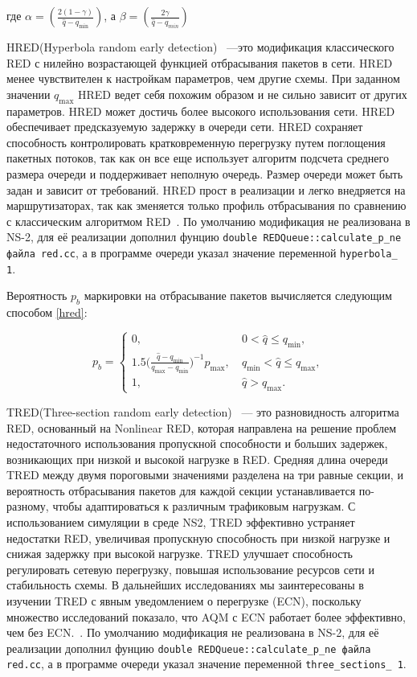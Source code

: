 где $\alpha = (\frac{2(1 - \gamma)}{\hat{q} - q_{\min}})$, а $\beta = (\frac{2\gamma}{\hat{q} - q_{min}})$


HRED(Hyperbola random early detection) ~---это модификация классического RED с нилейно возрастающей функцией отбрасывания пакетов в сети.
HRED менее чувствителен к настройкам параметров, чем другие схемы. При заданном значении $q_{\max}$ HRED ведет себя похожим образом и не сильно зависит от других параметров.
HRED может достичь более высокого использования сети. HRED обеспечивает предсказуемую задержку в очереди сети. HRED сохраняет способность контролировать кратковременную перегрузку путем поглощения пакетных потоков, так как он все еще использует алгоритм подсчета среднего размера очереди и поддерживает неполную очередь. Размер очереди может быть задан и зависит от требований. HRED прост в реализации и легко внедряется на маршрутизаторах, так как зменяется только профиль отбрасывания по сравнению с классическим алгоритмом RED~\cite{HRED}. По умолчанию модификация не реализована в NS-2, для её реализации дополнил фунцию \verb|double REDQueue::calculate_p_ne файла red.cc|, а в программе очереди указал значение переменной \verb|hyperbola_ 1|.
 
Вероятность $p_{b}$ маркировки на
отбрасывание пакетов вычисляется следующим способом \eqref{hred}:

\begin{equation}
\label{hred}
p_{b} = \begin{cases}
        0, &  \ 0 < \hat{q} \leqslant q_{\min},
        \\
        1.5({\frac{\hat{q} - q_{\min}}{q_{\max} - q_{\min}})^{-1}} {p_{\max}}, & \ q_{\min} < \hat{q} \leqslant q_{\max},
        \\
        1, &  \ \hat{q} > q_{\max}.
\end{cases}
\end{equation}


TRED(Three-section random early detection) ~--- это разновидность алгоритма RED, основанный на Nonlinear RED, которая направлена на решение проблем недостаточного использования пропускной способности и больших задержек, возникающих при низкой и высокой нагрузке в RED. 
Средняя длина очереди TRED между двумя пороговыми значениями разделена на три равные секции, и вероятность отбрасывания пакетов для каждой секции устанавливается по-разному, чтобы адаптироваться к различным трафиковым нагрузкам. С использованием симуляции в среде NS2, TRED эффективно устраняет недостатки RED, увеличивая пропускную способность при низкой нагрузке и снижая задержку при высокой нагрузке. TRED улучшает способность регулировать сетевую перегрузку, повышая использование ресурсов сети и стабильность схемы. В дальнейших исследованиях мы заинтересованы в изучении TRED с явным уведомлением о перегрузке (ECN), поскольку множество исследований показало, что AQM с ECN работает более эффективно, чем без ECN.~\cite{TRED}. По умолчанию модификация не реализована в NS-2, для её реализации дополнил фунцию \verb|double REDQueue::calculate_p_ne файла red.cc|, а в программе очереди указал значение переменной \verb|three_sections_ 1|. 

